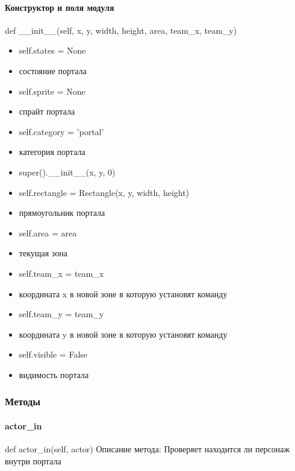 \paragraph{Конструктор и поля модуля}
def \_\_init\_\_(self, x, y, width, height, area, team\_x, team\_y)
\begin{itemize}
	\item self.states = None
	\item состояние портала
	\item self.sprite = None
	\item спрайт портала
	\item self.category = 'portal'
	\item категория портала
	\item super().\_\_init\_\_(x, y, 0)
	\item self.rectangle = Rectangle(x, y, width, height)
	\item прямоугольник портала
	\item self.area = area
	\item текущая зона
	\item self.team\_x = team\_x
	\item координата x в новой зоне в которую установят команду
	\item self.team\_y = team\_y
	\item координата y в новой зоне в которую установят команду
	\item self.visible = False
	\item видимость портала
\end{itemize}
\subsubsection{Методы}
\paragraph{actor\_in}
def actor\_in(self, actor)
Описание метода: Проверяет находится ли персонаж внутри портала

